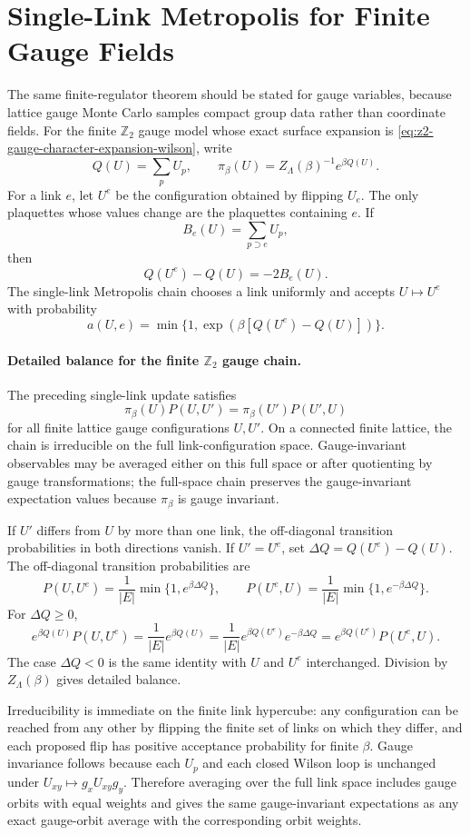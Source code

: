 \section{Single-Link Metropolis for Finite Gauge Fields}

The same finite-regulator theorem should be stated for gauge variables,
because lattice gauge Monte Carlo samples compact group data rather than
coordinate fields.  For the finite \(\mathbb Z_2\) gauge model whose exact
surface expansion is \eqref{eq:z2-gauge-character-expansion-wilson}, write
\[
  Q(U)=\sum_{p}U_p,\qquad
  \pi_\beta(U)=Z_\Lambda(\beta)^{-1}e^{\beta Q(U)} .
\]
For a link \(e\), let \(U^e\) be the configuration obtained by flipping
\(U_e\).  The only plaquettes whose values change are the plaquettes
containing \(e\).  If
\[
  B_e(U)=\sum_{p\supset e} U_p ,
\]
then
\[
  Q(U^e)-Q(U)=-2B_e(U).
\]
The single-link Metropolis chain chooses a link uniformly and accepts
\(U\mapsto U^e\) with probability
\[
  a(U,e)=\min\{1,\exp(\beta[Q(U^e)-Q(U)])\}.
\]

\paragraph{Detailed balance for the finite \(\mathbb Z_2\) gauge chain.}
The preceding single-link update satisfies
\[
  \pi_\beta(U)P(U,U')
  =
  \pi_\beta(U')P(U',U)
\]
for all finite lattice gauge configurations \(U,U'\).  On a connected finite
lattice, the chain is irreducible on the full link-configuration space.
Gauge-invariant observables may be averaged either on this full space or
after quotienting by gauge transformations; the full-space chain preserves
the gauge-invariant expectation values because \(\pi_\beta\) is gauge
invariant.

If \(U'\) differs from \(U\) by more than one link, the off-diagonal
transition probabilities in both directions vanish.  If \(U'=U^e\), set
\(\Delta Q=Q(U^e)-Q(U)\).  The off-diagonal transition probabilities are
\[
  P(U,U^e)=\frac1{|E|}\min\{1,e^{\beta\Delta Q}\},
  \qquad
  P(U^e,U)=\frac1{|E|}\min\{1,e^{-\beta\Delta Q}\}.
\]
For \(\Delta Q\geq0\),
\[
  e^{\beta Q(U)}P(U,U^e)
  =
  \frac1{|E|}e^{\beta Q(U)}
  =
  \frac1{|E|}e^{\beta Q(U^e)}e^{-\beta\Delta Q}
  =
  e^{\beta Q(U^e)}P(U^e,U).
\]
The case \(\Delta Q<0\) is the same identity with \(U\) and \(U^e\)
interchanged.  Division by \(Z_\Lambda(\beta)\) gives detailed balance.

Irreducibility is immediate on the finite link hypercube: any configuration
can be reached from any other by flipping the finite set of links on which
they differ, and each proposed flip has positive acceptance probability for
finite \(\beta\).  Gauge invariance follows because each \(U_p\) and each
closed Wilson loop is unchanged under \(U_{xy}\mapsto g_xU_{xy}g_y\).
Therefore averaging over the full link space includes gauge orbits with equal
weights and gives the same gauge-invariant expectations as any exact
gauge-orbit average with the corresponding orbit weights.

